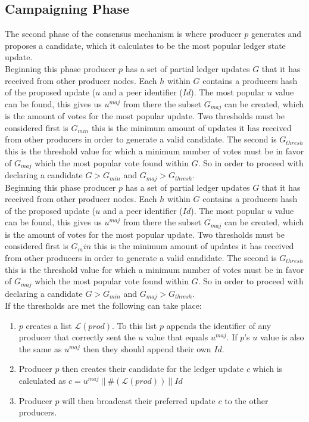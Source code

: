 \documentclass{article}
\begin{document}

\subsection{Campaigning Phase}

The second phase of the consensus mechanism is where producer $p$ generates and proposes a candidate, which it calculates to be the most popular ledger state update. \\


Beginning this phase producer $p$ has a set of partial ledger updates $G$ that it has received from other producer nodes. Each $h$ within $G$ contains a producers hash of the proposed update ($u$ and a peer identifier ($Id$). The most popular $u$ value can be found, this gives us $u^{maj}$ from there the subset $G_{maj}$ can be created, which is the amount of votes for the most popular update. Two thresholds must be considered first is $G_{min}$ this is the minimum amount of updates it has received from other producers in order to generate a valid candidate. The second is $G_{thresh}$ this is the threshold value for which a minimum number of votes must be in favor of $G_{maj}$ which the most popular vote found within $G$.  So in order to proceed with declaring a candidate $G > G_{min}$ and $G_{maj} > G_{thresh}$. \\

Beginning this phase producer $p$ has a set of partial ledger updates $G$ that it has received from other producer nodes. Each $h$ within $G$ contains a producers hash of the proposed update ($u$ and a peer identifier ($Id$). The most popular $u$ value can be found, this gives us $u^{maj}$ from there the subset $G_{maj}$ can be created, which is the amount of votes for the most popular update. Two thresholds must be considered first is $G_min$ this is the minimum amount of updates it has received from other producers in order to generate a valid candidate. The second is $G_{thresh}$ this is the threshold value for which a minimum number of votes must be in favor of $G_{maj}$ which the most popular vote found within $G$.  So in order to proceed with declaring a candidate $G > G_{min}$ and $G_{maj} > G_{thresh}$. \\

If the thresholds are met the following can take place:

\begin{enumerate}
\item $p$ creates a list $\mathcal{L}(prod)$. To this list $p$ appends the identifier of any producer that correctly sent the $u$ value that equals $u^{maj}$. If $p$'s $u$ value is also the same as $u^{maj}$ then they should append their own $Id$.
\item Producer $p$ then creates their candidate for the ledger update $c$ which is calculated as $c = u^{maj}~||~\#(\mathcal{L}(prod))~||~Id$
\item Producer $p$ will then broadcast their preferred update $c$ to the other producers. 
\end{enumerate}
\end{document}
